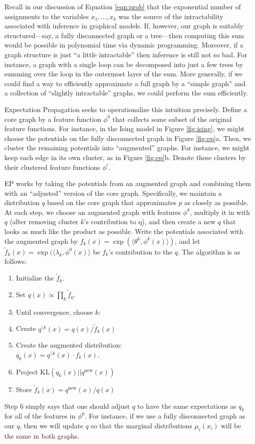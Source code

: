 \documentclass[times, 10pt,twocolumn]{article}
\newcommand{\bs}[0]{\textrm{\textbackslash}}
\begin{document}
Recall in our discussion of Equation \ref{eqn:prob} that the
exponential number of assignments to the variables $x_1,\ldots,x_k$
was the source of the intractability associated with inference in
graphical models. If, however, our graph is suitably structured---say,
a fully disconnected graph or a tree---then computing this sum would
be possible in polynomial time via dynamic programming. Moreover,
if a graph structure is just ``a little intractable'' then inference
is still not so bad. For instance, a graph with a single loop can
be decomposed into just a few trees by summing over the loop in the
outermost layer of the sum. More generally, if we could find a way
to efficiently approximate a full graph by a ``simple graph'' and a
collection of ``slightly intractable'' graphs, we could perform the
sum efficiently.

Expectation Propagation\cite{Minka01} seeks to operationalize this
intuition precisely. Define a core graph by a feature function
$\phi^0$ that collects some subset of the original feature
functions. For instance, in the Ising model in Figure
\ref{fig:ising}, we might choose the potentials on the fully
disconnected graph in Figure \ref{fig:ep}a. Then, we cluster the
remaining potentials into ``augmented'' graphs. For instance, we
might keep each edge in its own cluster, as in Figure
\ref{fig:ep}b. Denote these clusters by their clustered feature
functions $\phi^i$.

EP works by taking the potentials from an augmented graph and
combining them with an ``adjusted'' version of the core graph.
Specifically, we maintain a distribution $q$ based on the core graph
that approximates $p$ as closely as possible. At each step, we
choose an augmented graph with features $\phi^k$, multiply it in
with $q$ (after removing cluster $k$'s contribution to q), and then
create a new $q$ that looks as much like the product as possible.
Write the potentials associated with the augmented graph by $f_k(x)
= \exp( \langle \theta^k, \phi^k(x) \rangle )$, and let
$\tilde f_k(x) = \exp( \langle \lambda_k, \phi^0(x)\rangle$ be
$f_k$'s contribution to the $q$. The algorithm is as follows:
\begin{enumerate}
  \item Initialize the $\tilde f_k$.
  \item Set $q(x) \propto \prod_k \tilde f_k$.
  \item Until convergence, choose $k$:
  \item Create $q^{\bs k}(x) = q(x) / \tilde f_k(x)$
  \item Create the augmented distribution:\\
    $q_k(x) = q^{\bs
    k}(x)\cdot f_k(x)$.
  \item Project $\mathrm{KL}(q_k(x) || q^{\textrm{new}}(x))$
  \item Store $\tilde f_k(x) = q^{\textrm{new}}(x)/q(x)$
\end{enumerate}
Step 6 simply says that one should adjust $q$ to have the same
expectations as $q_k$ for all of the features in $\phi^0$. For
instance, if we use a fully disconnected graph as our $q$, then we
will update $q$ so that the marginal distributions $\mu_i(x_i)$
will be the same in both graphs.
\end{document}

